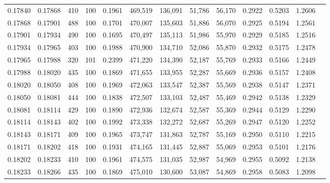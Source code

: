 \begin{tabular}{rrrrrrrrrrrrr}
0.17840 & 0.17868 &   410 & 100 &                                     0.1961 & 469,519 & 136,091 &  51,786 &  56,170 & 0.2922 & 0.5203 & 1.2606 \\
0.17868 & 0.17901 &   488 & 100 &                                     0.1701 & 470,007 & 135,603 &  51,886 &  56,070 & 0.2925 & 0.5194 & 1.2561 \\
0.17901 & 0.17934 &   490 & 100 &                                     0.1695 & 470,497 & 135,113 &  51,986 &  55,970 & 0.2929 & 0.5185 & 1.2516 \\
0.17934 & 0.17965 &   403 & 100 &                                     0.1988 & 470,900 & 134,710 &  52,086 &  55,870 & 0.2932 & 0.5175 & 1.2478 \\
0.17965 & 0.17988 &   320 & 101 &                                     0.2399 & 471,220 & 134,390 &  52,187 &  55,769 & 0.2933 & 0.5166 & 1.2449 \\
0.17988 & 0.18020 &   435 & 100 &                                     0.1869 & 471,655 & 133,955 &  52,287 &  55,669 & 0.2936 & 0.5157 & 1.2408 \\
0.18020 & 0.18050 &   408 & 100 &                                     0.1969 & 472,063 & 133,547 &  52,387 &  55,569 & 0.2938 & 0.5147 & 1.2371 \\
0.18050 & 0.18081 &   444 & 100 &                                     0.1838 & 472,507 & 133,103 &  52,487 &  55,469 & 0.2942 & 0.5138 & 1.2329 \\
0.18081 & 0.18114 &   429 & 100 &                                     0.1890 & 472,936 & 132,674 &  52,587 &  55,369 & 0.2944 & 0.5129 & 1.2290 \\
0.18114 & 0.18143 &   402 & 100 &                                     0.1992 & 473,338 & 132,272 &  52,687 &  55,269 & 0.2947 & 0.5120 & 1.2252 \\
0.18143 & 0.18171 &   409 & 100 &                                     0.1965 & 473,747 & 131,863 &  52,787 &  55,169 & 0.2950 & 0.5110 & 1.2215 \\
0.18171 & 0.18202 &   418 & 100 &                                     0.1931 & 474,165 & 131,445 &  52,887 &  55,069 & 0.2953 & 0.5101 & 1.2176 \\
0.18202 & 0.18233 &   410 & 100 &                                     0.1961 & 474,575 & 131,035 &  52,987 &  54,969 & 0.2955 & 0.5092 & 1.2138 \\
0.18233 & 0.18266 &   435 & 100 &                                     0.1869 & 475,010 & 130,600 &  53,087 &  54,869 & 0.2958 & 0.5083 & 1.2098 \\

\end{tabular}
